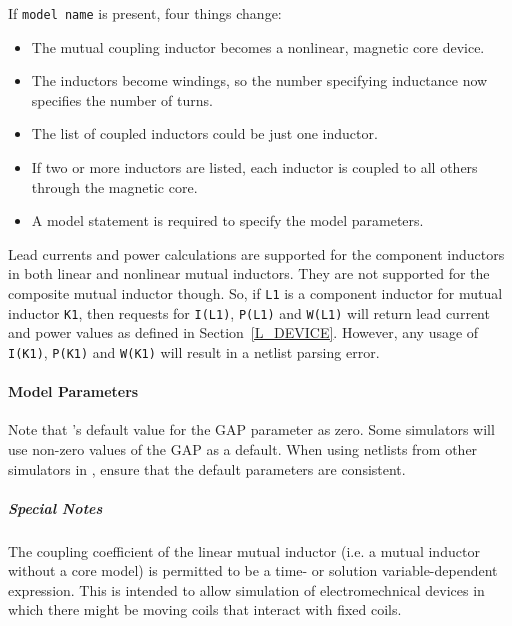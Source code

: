 \begin{Device}
\begin{Parameters}

If \texttt{model name} is present, four things change:
\begin{itemize}
  \item The mutual coupling inductor becomes a nonlinear, magnetic core device.
  \item The inductors become windings, so the number specifying inductance now
        specifies the number of turns.
  \item The list of coupled inductors could be just one inductor.
  \item If two or more inductors are listed, each inductor is coupled to all others through the magnetic core.
  \item A model statement is required to specify the model parameters.
\end{itemize}

\end{Parameters}

\comments
Lead currents and power calculations are supported for the component inductors in both
linear and nonlinear mutual inductors.  They are not supported for the composite
mutual inductor though.  So, if \texttt{L1} is a component inductor for mutual inductor
\texttt{K1}, then requests for \texttt{I(L1)}, \texttt{P(L1)} and \texttt{W(L1)} will 
return lead current and power values as defined in Section~\ref{L_DEVICE}.  However, 
any usage of \texttt{I(K1)}, \texttt{P(K1)} and \texttt{W(K1)} will result in a 
\Xyce{} netlist parsing error.

\end{Device}

\paragraph{Model Parameters}


Note that \Xyce's default value for the $\mbox{GAP}$ parameter as zero.  Some simulators
will use non-zero values of the $\mbox{GAP}$ as a default.  When using netlists from 
other simulators in \Xyce, ensure that the default parameters are consistent. 

\subparagraph{Special Notes}

The coupling coefficient of the linear mutual
inductor (i.e. a mutual inductor without a core model) is permitted to
be a time- or solution variable-dependent expression.  This is
intended to allow simulation of electromechnical devices in which
there might be moving coils that interact with fixed coils.  

